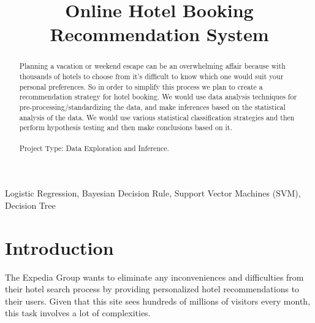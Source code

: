 \documentclass[conference]{IEEEtran}
\begin{document}
\title{\LARGE Online Hotel Booking Recommendation System}


 \author{
}

\maketitle

\begin{abstract}
Planning a vacation or weekend escape can be an overwhelming affair because with thousands of hotels to choose from it’s difficult to know which one would suit your personal preferences. So in order to simplify this process we plan to create a recommendation strategy for hotel booking. We would use data analysis techniques for pre-processing/standardizing the data, and make inferences based on the statistical analysis of the data. We would use various statistical classification strategies and then perform hypothesis testing and then make conclusions based on it.
\\
\\ Project Type: Data Exploration and Inference.
\\
\end{abstract}

\IEEEoverridecommandlockouts
\begin{keywords}
Logistic Regression, Bayesian Decision Rule, Support Vector Machines (SVM), Decision Tree
\end{keywords}

\IEEEpeerreviewmaketitle



\section{\textbf{Introduction}}
The Expedia Group wants to eliminate any inconveniences and difficulties from their hotel search process by providing personalized hotel recommendations to their users. Given that this site sees hundreds of millions of visitors every month, this task involves a lot of complexities.
\end{document}

